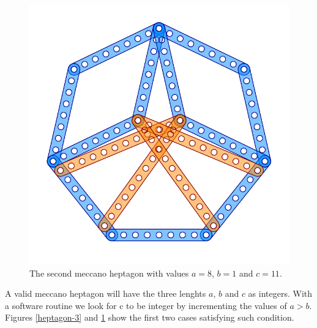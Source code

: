 \documentclass[11pt]{article}
\begin{document}
\begin{figure}[htp]
\centering
\includegraphics[scale=1]{figs/heptagon-8}
\caption{The second meccano heptagon with values $a=8$, $b=1$ and $c=11$.}
\label{heptagon-8}
\end{figure}

A valid meccano heptagon will have the three lenghts $a$, $b$ and $c$ as integers. With a software routine we look for c to be integer by incrementing the values of $a > b$. Figures \ref{heptagon-3} and \ref{heptagon-8} show the first two cases satisfying such condition.
\end{document}
